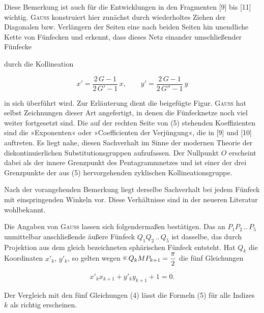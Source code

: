 Diese Bemerkung ist auch für die Entwicklungen in den Fragmenten [9] bis [11]
wichtig. \textsc{Gauss} konstruiert hier zunächst durch wiederholtes Ziehen der Diagonalen bzw.
Verlängern der Seiten eine nach beiden
Seiten hin unendliche Kette von Fünfecken und erkennt, dass dieses Netz einander umschließender Fünfecke

\begin{center}\end{center}

durch die Kollineation

\[
x' = \dfrac{2\,G-1}{2\,G'-1}\,x, \qquad y' = \dfrac{2\,G-1}{2\,G''-1}\,y\tag{5}
\]

in sich überführt wird. Zur Erläuterung dient die beigefügte Figur. \textsc{Gauss} hat selbst Zeichnungen dieser Art angefertigt, in denen die Fünfecknetze noch viel weiter fortgesetzt sind. Die auf der rechten Seite von (5) stehenden Koeffizienten sind die »Exponenten« oder »Coefficienten der Verjüngung«, die in [9] und [10] auftreten. Es liegt nahe, diesen Sachverhalt im Sinne der modernen Theorie der diskontinuierlichen Substitutionsgruppen aufzufassen. Der Nullpunkt $O$ erscheint dabei als der innere Grenzpunkt des Pentagrammnetzes und ist einer der drei Grenzpunkte der aus (5) hervorgehenden zyklischen Kollineationsgruppe.

Nach der vorangehenden Bemerkung liegt derselbe Sachverhalt bei jedem Fünfeck mit einspringenden Winkeln vor. Diese Verhältnisse sind in der neueren Literatur wohlbekannt.

Die Angaben von \textsc{Gauss} lassen sich folgendermaßen bestätigen. Das an $P_1P_2\,..\,P_5$ unmittelbar anschließende äußere Fünfeck $Q_1Q_2\,..\,Q_5$ ist dasselbe, das durch Projektion aus dem gleich bezeichneten sphärischen Fünfeck entsteht. Hat $Q_k$ die Koordinaten $x'_k$, $y'_k$, so gelten wegen $\HistAngle\,Q_kMP_{k+1} = \dfrac{\pi}{2}$ die fünf Gleichungen

\[
x'_k x_{k+1} + y'_k y_{k+1} + 1 = 0.
\]

Der Vergleich mit den fünf Gleichungen (4) lässt die Formeln (5) für alle Indizes $k$ als richtig erscheinen.

